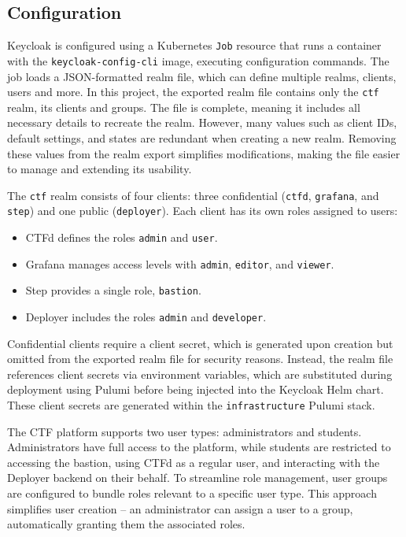 \subsection{Configuration}
Keycloak is configured using a Kubernetes \texttt{Job} resource that runs a container with the \texttt{keycloak-config-cli} image, executing configuration commands. The job loads a JSON-formatted realm file, which can define multiple realms, clients, users and more. In this project, the exported realm file contains only the \texttt{ctf} realm, its clients and groups. The file is complete, meaning it includes all necessary details to recreate the realm. However, many values such as client IDs, default settings, and states are redundant when creating a new realm. Removing these values from the realm export simplifies modifications, making the file easier to manage and extending its usability.

The \texttt{ctf} realm consists of four clients: three confidential (\texttt{ctfd}, \texttt{grafana}, and \texttt{step}) and one public (\texttt{deployer}). Each client has its own roles assigned to users:

\begin{itemize} 
    \item CTFd defines the roles \texttt{admin} and \texttt{user}. 
    \item Grafana manages access levels with \texttt{admin}, \texttt{editor}, and \texttt{viewer}. 
    \item Step provides a single role, \texttt{bastion}. 
    \item Deployer includes the roles \texttt{admin} and \texttt{developer}. \end{itemize}

Confidential clients require a client secret, which is generated upon creation but omitted from the exported realm file for security reasons. Instead, the realm file references client secrets via environment variables, which are substituted during deployment using Pulumi before being injected into the Keycloak Helm chart. These client secrets are generated within the \texttt{infrastructure} Pulumi stack.

The CTF platform supports two user types: administrators and students. Administrators have full access to the platform, while students are restricted to accessing the bastion, using CTFd as a regular user, and interacting with the Deployer backend on their behalf. To streamline role management, user groups are configured to bundle roles relevant to a specific user type. This approach simplifies user creation -- an administrator can assign a user to a group, automatically granting them the associated roles.

